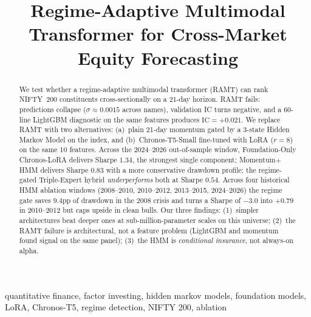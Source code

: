 \documentclass[conference]{IEEEtran}
\begin{document}
\title{Regime-Adaptive Multimodal Transformer for
Cross-Market Equity Forecasting}

\author{
\and
{}
}
\maketitle

\begin{abstract}
We test whether a regime-adaptive multimodal transformer (RAMT) can rank NIFTY~200
constituents cross-sectionally on a 21-day horizon. RAMT fails: predictions collapse
($\sigma \approx 0.0015$ across names), validation IC turns negative, and a
60-line LightGBM diagnostic on the same features produces $\mathrm{IC}=+0.021$.
We replace RAMT with two alternatives: (a)~plain 21-day momentum gated by a 3-state
Hidden Markov Model on the index, and (b)~Chronos-T5-Small fine-tuned with LoRA
($r{=}8$) on the same 10 features. Across the 2024--2026 out-of-sample window,
Foundation-Only Chronos-LoRA delivers Sharpe $1.34$, the strongest single component;
Momentum$+$HMM delivers Sharpe $0.83$ with a more conservative drawdown profile;
the regime-gated Triple-Expert hybrid \emph{underperforms} both at Sharpe $0.54$.
Across four historical HMM ablation windows (2008--2010, 2010--2012, 2013--2015,
2024--2026) the regime gate saves $9.4$pp of drawdown in the 2008 crisis and
turns a Sharpe of $-3.0$ into $+0.79$ in 2010--2012 but caps upside in clean bulls.
Our three findings: (1)~simpler architectures beat deeper ones at sub-million-parameter
scales on this universe; (2)~the RAMT failure is architectural, not a feature
problem (LightGBM and momentum found signal on the same panel); (3)~the HMM is
\emph{conditional insurance}, not always-on alpha.
\end{abstract}

\begin{IEEEkeywords}
quantitative finance, factor investing, hidden markov models, foundation models,
LoRA, Chronos-T5, regime detection, NIFTY 200, ablation
\end{IEEEkeywords}
\end{document}
